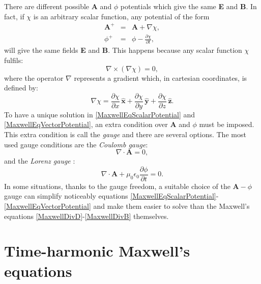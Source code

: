 There are different possible \textbf{A} and $\phi$ potentials which give the same \textbf{E} and \textbf{B}. In fact, if $\chi$ is an arbitrary scalar function, any potential of the form
\begin{eqnarray} 
	\mathbf{A}^{+} &=& \mathbf{A} + \nabla\chi, \label{PossibleA}
	\\
	\phi^{+} &=& \phi - \frac{\partial\chi}{\partial t},\label{PossibleScalar}
\end{eqnarray}
will give the same fields \textbf{E} and \textbf{B}. This happens because any scalar function $\chi$ fulfils: 
\begin{equation}\label{CurlGrad}
    \nabla\times\left(\nabla\chi\right) = 0,
\end{equation}
where the operator $\nabla$ represents a gradient which, in cartesian coordinates, is defined by:
\begin{equation}\label{GradientOperator}
    \nabla\chi = \frac{\partial\chi}{\partial x}\,\mathbf{\hat{x}}  + \frac{\partial\chi}{\partial y}\,\mathbf{\hat{y}}  + \frac{\partial\chi}{\partial z}\,\mathbf{\hat{z}}.
\end{equation}
To have a unique solution in \eqref{MaxwellEqScalarPotential} and \eqref{MaxwellEqVectorPotential}, an extra condition over \textbf{A} and $\phi$ must be imposed. This extra condition is call the \emph{gauge} and there are several options. The most used gauge conditions are the \emph{Coulomb gauge}:
\begin{equation}\label{CoulombGauge}
    \nabla\cdot\mathbf{A} = 0,
\end{equation}
and the \emph{Lorenz gauge} \cite{LorenzLorentz, LorenzLorentz2}:
\begin{equation}\label{LorentzGauge}
    \nabla\cdot\mathbf{A} + \mu_{0}\epsilon_{0}\frac{\partial\phi}{\partial t} = 0.
\end{equation}
In some situations, thanks to the gauge freedom, a suitable choice of the $\textbf{A}-\phi$ gauge can simplify noticeably equations \eqref{MaxwellEqScalarPotential}-\eqref{MaxwellEqVectorPotential} and make them easier to solve than the Maxwell's equations \eqref{MaxwellDivD}-\eqref{MaxwellDivB} themselves.

\section{Time-harmonic Maxwell's equations}\label{sEMTH}

